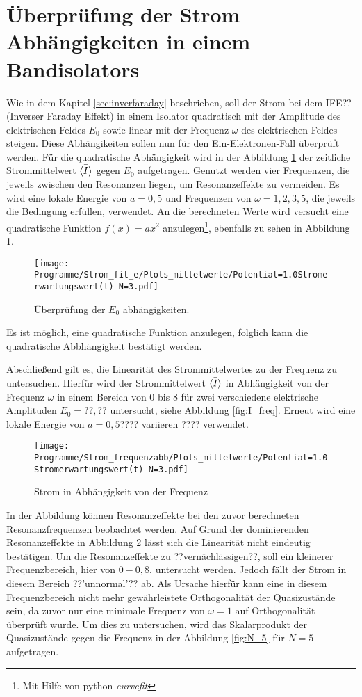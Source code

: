 \section{Überprüfung der Strom Abhängigkeiten in einem Bandisolators}
Wie in dem Kapitel \ref{sec:inverfaraday} beschrieben,
soll der Strom bei dem IFE??(Inverser Faraday Effekt)
in einem Isolator quadratisch
mit der Amplitude des elektrischen Feldes $E_0$
sowie linear mit der Frequenz $\omega$ des elektrischen
Feldes steigen. Diese Abhängikeiten sollen nun für den
 Ein-Elektronen-Fall überprüft werden.
Für die quadratische Abhängigkeit wird in der Abbildung
\ref{fig:E_abb} der zeitliche Strommittelwert $\bar{\braket{I}}$
 gegen $E_0$ aufgetragen.
Genutzt werden
vier Frequenzen, die jeweils zwischen den Resonanzen liegen, um Resonanzeffekte zu vermeiden.
Es wird eine lokale Energie von $a=0,5$ und Frequenzen von $\omega=1,2,3,5$,
die jeweils die Bedingung erfüllen, verwendet.
An die berechneten Werte wird versucht eine quadratische Funktion $f(x)=ax^2$
anzulegen\footnote{Mit Hilfe von python \textit{curvefit} }, ebenfalls zu sehen
in Abbildung \ref{fig:E_abb}.

\begin{figure}
  \centering
  \texttt{[image: Programme/Strom\_fit\_e/Plots\_mittelwerte/Potential=1.0Stromerwartungswert(t)\_N=3.pdf]}
  \caption{Überprüfung der $E_0$ abhängigkeiten.}
  \label{fig:E_abb}
\end{figure}

Es ist möglich, eine quadratische Funktion anzulegen,
folglich kann die quadratische Abbhängigkeit
bestätigt werden.

Abschließend gilt es, die Linearität des Strommittelwertes
 zu der Frequenz zu untersuchen.
Hierfür wird der Strommittelwert $\bar{\braket{I}}$
in Abhängigkeit von der Frequenz $\omega$ in einem
Bereich von $0$ bis $8$ für
zwei verschiedene elektrische Amplituden $E_0=??,??$
untersucht, siehe Abbildung \ref{fig:I_freq}.
Erneut wird eine lokale Energie von $a=0,5$???? variieren ???? verwendet.

\begin{figure}
   \centering
   \texttt{[image: Programme/Strom\_frequenzabb/Plots\_mittelwerte/Potential=1.0Stromerwartungswert(t)\_N=3.pdf]}
   \caption{Strom in Abhängigkeit von der Frequenz}
   \label{fig:w_abb}
\end{figure}


In der Abbildung können Resonanzeffekte
bei den zuvor berechneten Resonanzfrequenzen
beobachtet werden. Auf Grund der
dominierenden Resonanzeffekte in Abbildung \ref{fig:w_abb}
lässt sich die Linearität nicht eindeutig bestätigen.
Um die Resonanzeffekte zu ??vernächlässigen??, soll ein kleinerer Frequenzbereich, hier von
$0-0,8$, untersucht werden.
Jedoch fällt der Strom in diesem Bereich ??'unnormal'??
ab. Als Ursache hierfür kann eine in diesem
Frequenzbereich nicht mehr gewährleistete Orthogonalität der
Quasizustände sein, da zuvor nur eine minimale Frequenz
von $\omega=1$ auf Orthogonalität überprüft wurde.
Um dies zu untersuchen, wird das Skalarprodukt der Quasizustände gegen
die Frequenz \omega in der Abbildung \ref{fig:N_5} für $N=5$ aufgetragen.

